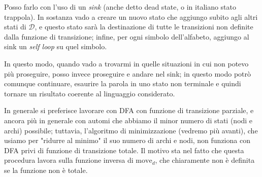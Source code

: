 \documentclass[class=book, crop=false, oneside, 12pt]{standalone}
\begin{document}
Posso farlo con l'uso di un \emph{sink} (anche detto dead state, o in italiano stato trappola). In sostanza vado a creare un nuovo stato che aggiungo subito agli altri stati di \(\mathcal{D}\), e questo stato sarà la destinazione di tutte le transizioni non definite dalla funzione di transizione; infine, per ogni simbolo dell'alfabeto, aggiungo al sink un \emph{self loop} su quel simbolo.

In questo modo, quando vado a trovarmi in quelle situazioni in cui non potevo più proseguire, posso invece proseguire e andare nel sink; in questo modo potrò comunque continuare, esaurire la parola in uno stato non terminale e quindi tornare un risultato coerente al linguaggio considerato.

In generale si preferisce lavorare con DFA con funzione di transizione parziale, e ancora più in generale con automi che abbiamo il minor numero di stati (nodi e archi) possibile; tuttavia, l'algoritmo di minimizzazione (vedremo più avanti), che usiamo per "ridurre al minimo" il suo numero di archi e nodi, non funziona con DFA privi di funzione di transizione totale. Il motivo sta nel fatto che questa procedura lavora sulla funzione inversa di \(\textrm{move}_d\), che chiaramente non è definita se la funzione non è totale.
\end{document}
